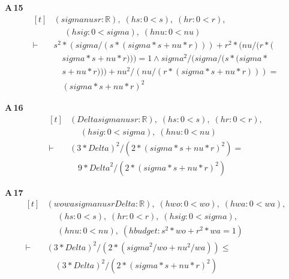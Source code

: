 \noindent\textbf{A\,15}\quad{}
{\footnotesize\[ \begin{aligned}[t]
&(\mathit{sigma} \mathit{nu} \mathit{s} \mathit{r} : \mathbb{R} ),\; (\mathit{hs} : 0 < \mathit{s}),\; (\mathit{hr} : 0 < \mathit{r}),\\
&\quad \; (\mathit{hsig} : 0 < \mathit{sigma}),\; (\mathit{hnu} : 0 < \mathit{nu})\\
\vdash\;&\mathit{s} ^{2} * (\mathit{sigma} / (\mathit{s} * (\mathit{sigma} * \mathit{s} + \mathit{nu} * \mathit{r}))) + \mathit{r} ^{2} * (\mathit{nu} / (\mathit{r} * (\\
&\quad \mathit{sigma} * \mathit{s} + \mathit{nu} * \mathit{r}))) = 1 \wedge \mathit{sigma} ^{2} / (\mathit{sigma} / (\mathit{s} * (\mathit{sigma} *\\
&\quad \mathit{s} + \mathit{nu} * \mathit{r}))) + \mathit{nu} ^{2} / (\mathit{nu} / (\mathit{r} * (\mathit{sigma} * \mathit{s} + \mathit{nu} * \mathit{r}))) =\\
&\quad (\mathit{sigma} * \mathit{s} + \mathit{nu} * \mathit{r}) ^{2}
\end{aligned} \]}

\noindent\textbf{A\,16}\quad{}
{\footnotesize\[ \begin{aligned}[t]
&(\mathit{Delta} \mathit{sigma} \mathit{nu} \mathit{s} \mathit{r} : \mathbb{R} ),\; (\mathit{hs} : 0 < \mathit{s}),\; (\mathit{hr} : 0 < \mathit{r}),\\
&\quad \; (\mathit{hsig} : 0 < \mathit{sigma}),\; (\mathit{hnu} : 0 < \mathit{nu})\\
\vdash\;&(3 * \mathit{Delta}) ^{2} / (2 * (\mathit{sigma} * \mathit{s} + \mathit{nu} * \mathit{r}) ^{2}) =\\
&\quad 9 * \mathit{Delta} ^{2} / (2 * (\mathit{sigma} * \mathit{s} + \mathit{nu} * \mathit{r}) ^{2})
\end{aligned} \]}

\noindent\textbf{A\,17}\quad{}
{\footnotesize\[ \begin{aligned}[t]
&(\mathit{wo} \mathit{wa} \mathit{sigma} \mathit{nu} \mathit{s} \mathit{r} \mathit{Delta} : \mathbb{R} ),\; (\mathit{hwo} : 0 < \mathit{wo}),\; (\mathit{hwa} : 0 < \mathit{wa}),\\
&\quad \; (\mathit{hs} : 0 < \mathit{s}),\; (\mathit{hr} : 0 < \mathit{r}),\; (\mathit{hsig} : 0 < \mathit{sigma}),\\
&\quad \; (\mathit{hnu} : 0 < \mathit{nu}),\; (\mathit{hbudget} : \mathit{s} ^{2} * \mathit{wo} + \mathit{r} ^{2} * \mathit{wa} = 1)\\
\vdash\;&(3 * \mathit{Delta}) ^{2} / (2 * (\mathit{sigma} ^{2} / \mathit{wo} + \mathit{nu} ^{2} / \mathit{wa})) \leq\\
&\quad (3 * \mathit{Delta}) ^{2} / (2 * (\mathit{sigma} * \mathit{s} + \mathit{nu} * \mathit{r}) ^{2})
\end{aligned} \]}

